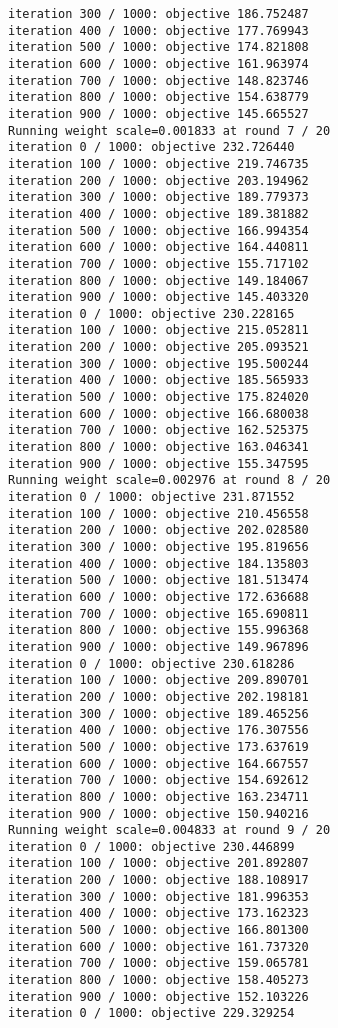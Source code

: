 \documentclass[11pt]{article}
\begin{document}
\begin{Verbatim}[commandchars=\\\{\}]
iteration 300 / 1000: objective 186.752487
iteration 400 / 1000: objective 177.769943
iteration 500 / 1000: objective 174.821808
iteration 600 / 1000: objective 161.963974
iteration 700 / 1000: objective 148.823746
iteration 800 / 1000: objective 154.638779
iteration 900 / 1000: objective 145.665527
Running weight scale=0.001833 at round 7 / 20
iteration 0 / 1000: objective 232.726440
iteration 100 / 1000: objective 219.746735
iteration 200 / 1000: objective 203.194962
iteration 300 / 1000: objective 189.779373
iteration 400 / 1000: objective 189.381882
iteration 500 / 1000: objective 166.994354
iteration 600 / 1000: objective 164.440811
iteration 700 / 1000: objective 155.717102
iteration 800 / 1000: objective 149.184067
iteration 900 / 1000: objective 145.403320
iteration 0 / 1000: objective 230.228165
iteration 100 / 1000: objective 215.052811
iteration 200 / 1000: objective 205.093521
iteration 300 / 1000: objective 195.500244
iteration 400 / 1000: objective 185.565933
iteration 500 / 1000: objective 175.824020
iteration 600 / 1000: objective 166.680038
iteration 700 / 1000: objective 162.525375
iteration 800 / 1000: objective 163.046341
iteration 900 / 1000: objective 155.347595
Running weight scale=0.002976 at round 8 / 20
iteration 0 / 1000: objective 231.871552
iteration 100 / 1000: objective 210.456558
iteration 200 / 1000: objective 202.028580
iteration 300 / 1000: objective 195.819656
iteration 400 / 1000: objective 184.135803
iteration 500 / 1000: objective 181.513474
iteration 600 / 1000: objective 172.636688
iteration 700 / 1000: objective 165.690811
iteration 800 / 1000: objective 155.996368
iteration 900 / 1000: objective 149.967896
iteration 0 / 1000: objective 230.618286
iteration 100 / 1000: objective 209.890701
iteration 200 / 1000: objective 202.198181
iteration 300 / 1000: objective 189.465256
iteration 400 / 1000: objective 176.307556
iteration 500 / 1000: objective 173.637619
iteration 600 / 1000: objective 164.667557
iteration 700 / 1000: objective 154.692612
iteration 800 / 1000: objective 163.234711
iteration 900 / 1000: objective 150.940216
Running weight scale=0.004833 at round 9 / 20
iteration 0 / 1000: objective 230.446899
iteration 100 / 1000: objective 201.892807
iteration 200 / 1000: objective 188.108917
iteration 300 / 1000: objective 181.996353
iteration 400 / 1000: objective 173.162323
iteration 500 / 1000: objective 166.801300
iteration 600 / 1000: objective 161.737320
iteration 700 / 1000: objective 159.065781
iteration 800 / 1000: objective 158.405273
iteration 900 / 1000: objective 152.103226
iteration 0 / 1000: objective 229.329254

\end{Verbatim}
\end{document}
